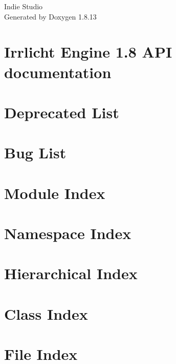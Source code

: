 \documentclass[twoside]{book}
\newcommand{\+}{\discretionary{\mbox{\scriptsize$\hookleftarrow$}}{}{}}
\newcommand{\clearemptydoublepage}{%
  \newpage{\pagestyle{empty}\cleardoublepage}%
}
\begin{document}
\hypersetup{pageanchor=false,
             bookmarksnumbered=true,
             pdfencoding=unicode
            }
\begin{titlepage}
\vspace*{7cm}
\begin{center}%
{\Large Indie Studio }\\
\vspace*{1cm}
{\large Generated by Doxygen 1.8.13}\\
\end{center}
\end{titlepage}
\clearemptydoublepage
{}
\tableofcontents
\clearemptydoublepage
{}
\hypersetup{pageanchor=true}

\chapter{Irrlicht Engine 1.8 A\+PI documentation}
\label{index}\hypertarget{index}{}
\chapter{Deprecated List}
\label{deprecated}

\chapter{Bug List}
\label{bug}

\chapter{Module Index}

\chapter{Namespace Index}

\chapter{Hierarchical Index}

\chapter{Class Index}

\chapter{File Index}

\end{document}
